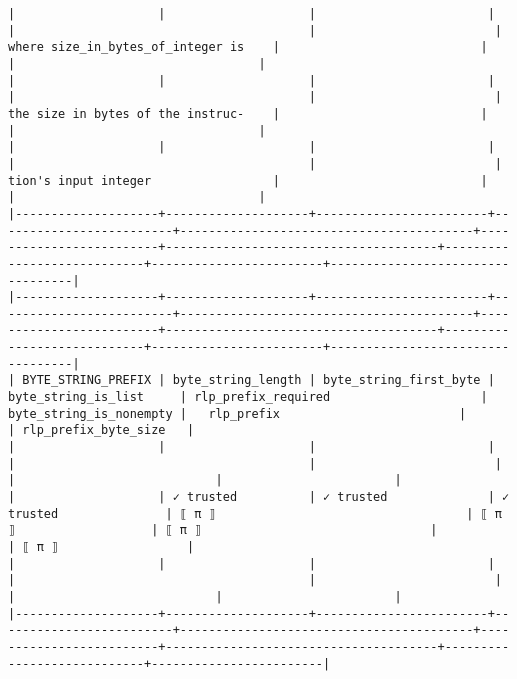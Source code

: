 \documentclass[varwidth=\maxdimen,margin=0.5cm,multi={verbatim}]{standalone}
\begin{document}
\begin{verbatim}
|                    |                    |                        |                         |                                         |                         | where size_in_bytes_of_integer is    |                            |                        |                                  |
|                    |                    |                        |                         |                                         |                         | the size in bytes of the instruc-    |                            |                        |                                  |
|                    |                    |                        |                         |                                         |                         | tion's input integer                 |                            |                        |                                  |
|--------------------+--------------------+------------------------+-------------------------+-----------------------------------------+-------------------------+--------------------------------------+----------------------------+------------------------+----------------------------------|
|--------------------+--------------------+------------------------+-------------------------+-----------------------------------------+-------------------------+--------------------------------------+----------------------------+------------------------+----------------------------------|
| BYTE_STRING_PREFIX | byte_string_length | byte_string_first_byte | byte_string_is_list     | rlp_prefix_required                     | byte_string_is_nonempty |   rlp_prefix                         |                            | rlp_prefix_byte_size   |
|                    |                    |                        |                         |                                         |                         |                                      |                            |                        |
|                    | ✓ trusted          | ✓ trusted              | ✓ trusted               | ⟦ π ⟧                                   | ⟦ π ⟧                   | ⟦ π ⟧                                |                            | ⟦ π ⟧                  |
|                    |                    |                        |                         |                                         |                         |                                      |                            |                        |
|--------------------+--------------------+------------------------+-------------------------+-----------------------------------------+-------------------------+--------------------------------------+----------------------------+------------------------|

\end{verbatim}
\end{document}
